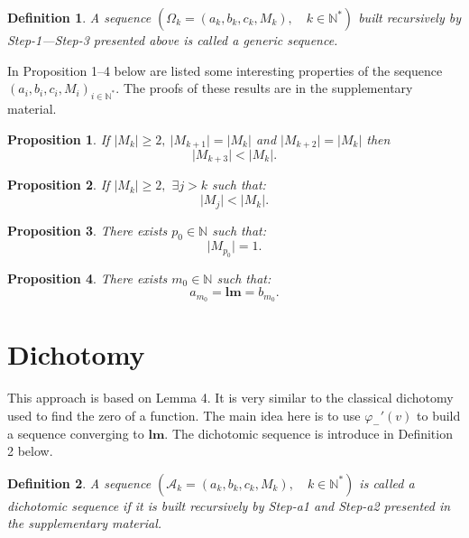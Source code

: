 \documentclass[
  11pt,
  a4paper,
]{article}
\newcommand\N{{\mathbb N}}
\newtheorem{definition}{Definition}
\newtheorem{proposition}{Proposition}
\begin{document}
\begin{definition}
	A sequence $\left(\Omega_k=\left(a_k,b_k,c_k,M_k \right),\quad k\in \N^*\right)$ 
	built recursively by  Step-1---Step-3 presented above is called a generic sequence.
\end{definition}      

In Proposition 1--4 below are listed some interesting properties of the sequence  $\left(a_i,b_i,c_i,M_i \right)_{i\in \N^*}.$
The proofs of these results are in the supplementary material.
\begin{proposition} 
	If $\lvert M_k\rvert\geq 2,\  \lvert M_{k+1}\rvert =\lvert M_k\rvert$ and   $\lvert M_{k+2}\rvert=\lvert M_k\rvert$ then
	\[
	\lvert M_{k+3}\rvert < \lvert M_k\rvert.
	\]
\end{proposition}



\begin{proposition} 
	If $\lvert M_k\rvert\geq 2,$  $\exists j>k$ such that:  
	\[
	\lvert M_{j}\rvert < \lvert M_k\rvert.
	\]
\end{proposition}




\begin{proposition} There exists $p_0\in\N$ 
	such that:  
	\[
	\lvert M_{p_0}\rvert =1.
	\]
\end{proposition}



\begin{proposition} There exists $m_0\in\N$ 
	such that:  
	\[
	a_{m_0}=\mathbf{lm}= b_{m_0}.
	\]
\end{proposition}






\section{Dichotomy}\label{sec:3}
This approach is based on Lemma 4. It is very similar to the classical dichotomy used to find the zero of a function.
The main idea here is to use $\varphi_{-}'(v)$ to build a sequence converging to $\mathbf{lm}.$ The dichotomic
sequence is introduce in Definition 2 below.


\begin{definition}
	A sequence $\left(\mathscr{A}_k=\left(a_k,b_k,c_k,M_k \right),\quad k\in \N^*\right)$ is called a dichotomic
	sequence if it is built recursively by  Step-a1  and  Step-a2 presented in the supplementary material.
\end{definition}    
\end{document}
